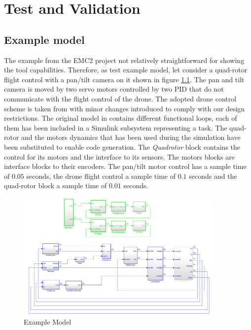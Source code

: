 
\chapter{Test and Validation}

\ifpdf
    \graphicspath{{Chapters/Figs/Raster/}{Chapters/Figs/PDF/}{Chapters/Figs/}}
\else
    \graphicspath{{Chapters/Figs/Vector/}{Chapters/Figs/}}
\fi


\section{Example model}
The example from the EMC2 project not relatively straightforward for showing the tool capabilities. Therefore, as test example model, let consider a quad-rotor flight control with a pan/tilt camera on it shown in figure \ref{fig:exampleModel}. The pan and tilt camera is moved by two servo motors controlled by two PID that do not communicate with the flight control of the drone. The adopted drone control scheme is taken from \cite{PeterCorke2011} with minor changes introduced to comply with our design restrictions. The original model in \cite{PeterCorke2011} contains different functional loops, each of them has been included in a Simulink subsystem representing a task. The quad-rotor and the motors dynamics that has been used during the simulation have been substituted to enable code generation. The \emph{Quadrotor} block contains the control for its motors and the interface to its sensors. The motors blocks are interface blocks to their encoders. The pan/tilt motor control has a sample time of $0.05$ seconds, the drone flight control a sample time of $0.1$ seconds and the quad-rotor block a sample time of $0.01$ seconds.
\begin{figure}[htbp] 
\centering    
\includegraphics[width=0.9\textwidth]{CompiledModel}
\caption{Example Model}
\label{fig:exampleModel}
\end{figure}


